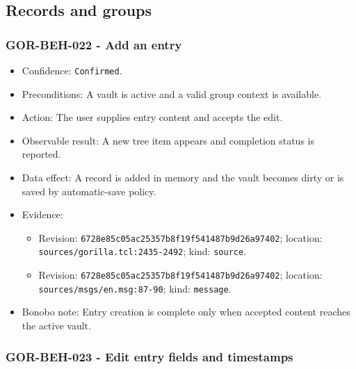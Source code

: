 \documentclass[
  letterpaper,
]{article}
\newcommand{\passthrough}[1]{#1}
\providecommand{\tightlist}{%
  \setlength{\itemsep}{0pt}\setlength{\parskip}{0pt}}
\begin{document}
\subsection{Records and groups}\label{records-and-groups}

\subsubsection{GOR-BEH-022 - Add an entry}\label{gor-beh-022---add-an-entry}

\begin{itemize}
\tightlist
\item
  Confidence: \passthrough{\lstinline!Confirmed!}.
\item
  Preconditions: A vault is active and a valid group context is available.
\item
  Action: The user supplies entry content and accepts the edit.
\item
  Observable result: A new tree item appears and completion status is reported.
\item
  Data effect: A record is added in memory and the vault becomes dirty or is saved by automatic-save policy.
\item
  Evidence:

  \begin{itemize}
  \tightlist
  \item
    Revision: \nolinkurl{6728e85c05ac25357b8f19f541487b9d26a97402}; location: \nolinkurl{sources/gorilla.tcl:2435-2492};
    kind: \passthrough{\lstinline!source!}.
  \item
    Revision: \nolinkurl{6728e85c05ac25357b8f19f541487b9d26a97402}; location: \nolinkurl{sources/msgs/en.msg:87-90};
    kind: \passthrough{\lstinline!message!}.
  \end{itemize}
\item
  Bonobo note: Entry creation is complete only when accepted content reaches the active vault.
\end{itemize}

\subsubsection{GOR-BEH-023 - Edit entry fields and timestamps}\label{gor-beh-023---edit-entry-fields-and-timestamps}
\end{document}
